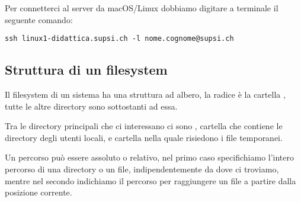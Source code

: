 \documentclass[../main.tex]{subfiles}
\begin{document}
Per connetterci al server da macOS/Linux dobbiamo digitare a terminale il seguente comando:
\begin{lstlisting}[style=bash]
    ssh linux1-didattica.supsi.ch -l nome.cognome@supsi.ch
\end{lstlisting}

\subsection{Struttura di un filesystem}
Il filesystem di un sistema ha una struttura ad albero, la radice è la cartella , tutte le altre directory sono sottostanti ad essa.

Tra le directory principali che ci interessano ci sono , cartella che contiene le directory degli utenti locali, e  cartella nella quale risiedono i file temporanei.

Un percorso può essere assoluto o relativo, nel primo caso specifichiamo l'intero percorso di una directory o un file, indipendentemente da dove ci troviamo, mentre nel secondo indichiamo il percorso per raggiungere un file a partire dalla posizione corrente.
\end{document}

